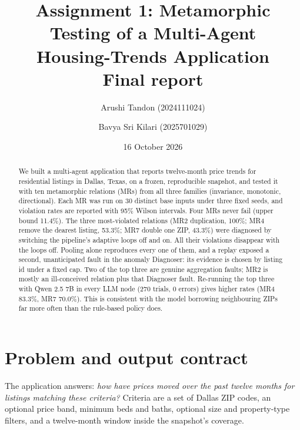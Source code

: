 \documentclass[11pt,a4paper]{article}
\title{\textbf{Assignment 1: Metamorphic Testing of a Multi-Agent\\Housing-Trends Application}\\[4pt]
\large Final report}
\author{Arushi Tandon (2024111024) \and Bavya Sri Kilari (2025701029)}
\date{16 October 2026}
\begin{document}
\maketitle

\begin{abstract}
We built a multi-agent application that reports twelve-month price trends for residential listings in Dallas, Texas,
on a frozen, reproducible snapshot, and tested it with ten metamorphic relations (MRs) from all three families
(invariance, monotonic, directional). Each MR was run on 30 distinct base inputs under three fixed seeds, and violation
rates are reported with 95\% Wilson intervals. Four MRs never fail (upper bound 11.4\%). The three most-violated
relations (MR2 duplication, 100\%; MR4 remove the dearest listing, 53.3\%; MR7 double one ZIP, 43.3\%) were
diagnosed by switching the pipeline's adaptive loops off and on. All their violations disappear with the loops off.
Pooling alone reproduces every one of them, and a replay exposed a second, unanticipated fault in the anomaly
Diagnoser: its evidence is chosen by listing id under a fixed cap. Two of the top three are genuine aggregation
faults; MR2 is mostly an ill-conceived relation plus that Diagnoser fault. Re-running the top three with Qwen 2.5 7B
in every LLM node (270 trials, 0 errors) gives higher rates (MR4 83.3\%, MR7 70.0\%). This is consistent with the model
borrowing neighbouring ZIPs far more often than the rule-based policy does.
\end{abstract}

\section{Problem and output contract}\label{sec:contract}

The application answers: \emph{how have prices moved over the past twelve months for listings matching these
criteria?} Criteria are a set of Dallas ZIP codes, an optional price band, minimum beds and baths, optional size and
property-type filters, and a twelve-month window inside the snapshot's coverage.
\end{document}
